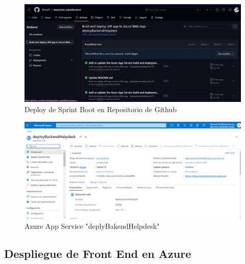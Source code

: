 \begin{figure}[H]
	\centering
	\includegraphics[width=1.1\textwidth]{CapituloImplem/Img/deploygit}
	\caption{Deploy de Sprint Boot en Repositorio de Github}
	\label{fig:deplyback}
\end{figure}

\begin{figure}[H]
	\centering
	\includegraphics[width=1.1 \textwidth ]{CapituloImplem/Img/InstanciaBackenNube}
	\caption{Azure App Service "deplyBakendHelpdesk"}
	\label{fig:Azurebkacket}
\end{figure}

 
 \subsection{Despliegue de Front End en Azure }
 
